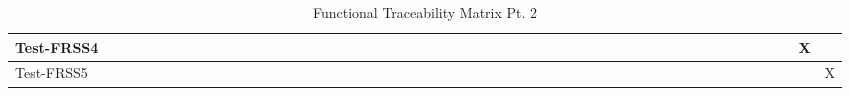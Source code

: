 \documentclass[12pt, titlepage]{article}
\begin{document}
\begin{landscape}
\begin{table}[H]
\begin{adjustwidth}{-0.1in}{-1in}
{\begin{tabular}{c|c|c|c|c|c|c|c|c|c|c|c|c|c|c|c|c|c|c|c|c|c|c|c|c|c|c|c|c|c|c|c|c|c|c|c|c|c|c|c|c|c|c|c|c|c|c|c|c|c|c|c|}
\multicolumn{1}{|l|}{{Test-FRSS4}}  &             &              &             &              &             &             &             &             &              &              &             &             &              &             &              &            && &&&&&&&&&&&&&&&&&&&&&&&&&&&&&&&&X&   \\ \hline
\multicolumn{1}{|l|}{{Test-FRSS5}}  &             &              &             &              &             &             &             &             &              &              &             &             &              &             &              &            &&  &&&&&&&&&&&&&&&&&&&&&&&&&&&&&&&&&X  \\ \hline



\end{tabular}
}
\caption{Functional Traceability Matrix Pt. 2}
    \label{tab:matrix2}
\end{adjustwidth}
\end{table}


\end{landscape}
\end{document}
